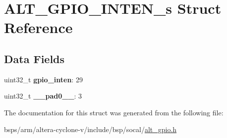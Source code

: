 \hypertarget{structALT__GPIO__INTEN__s}{}\section{A\+L\+T\+\_\+\+G\+P\+I\+O\+\_\+\+I\+N\+T\+E\+N\+\_\+s Struct Reference}
\label{structALT__GPIO__INTEN__s}
\subsection*{Data Fields}
\begin{DoxyCompactItemize}
\item 
\mbox{\label{structALT__GPIO__INTEN__s_a6de74033d26fc2e0d96260af990eeda4}} 
uint32\+\_\+t {\bfseries gpio\+\_\+inten}\+: 29
\item 
\mbox{\label{structALT__GPIO__INTEN__s_afacd5e235569d6e9e71816deb4abe06c}} 
uint32\+\_\+t {\bfseries \+\_\+\+\_\+pad0\+\_\+\+\_\+}\+: 3
\end{DoxyCompactItemize}


The documentation for this struct was generated from the following file\+:\begin{DoxyCompactItemize}
\item 
bsps/arm/altera-\/cyclone-\/v/include/bsp/socal/\mbox{\hyperlink{alt__gpio_8h}{alt\+\_\+gpio.\+h}}\end{DoxyCompactItemize}
